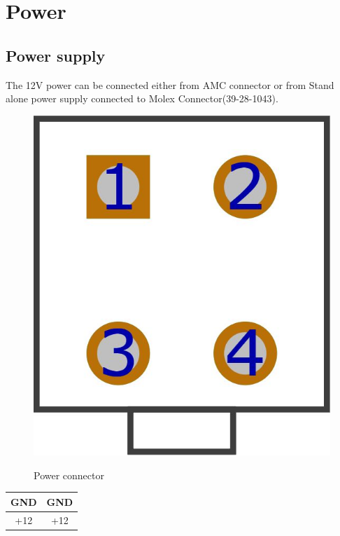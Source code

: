 \section{Power}
\subsection{Power supply}

The 12V power can be connected either from AMC connector or from Stand alone power supply connected to Molex Connector(39-28-1043).

	\begin{figure}[htbp!]
		\centering
		\includegraphics[scale=0.2]{img/molex.jpg}\\
		\caption{Power connector} 
	\end{figure}
\begin{center}
\begin{tabular}{|c|c|} \hline
	{\LARGE GND} & {\LARGE GND} \\ \hline
	{\LARGE +12} & {\LARGE +12} \\ \hline
\end{tabular}
\end{center}

